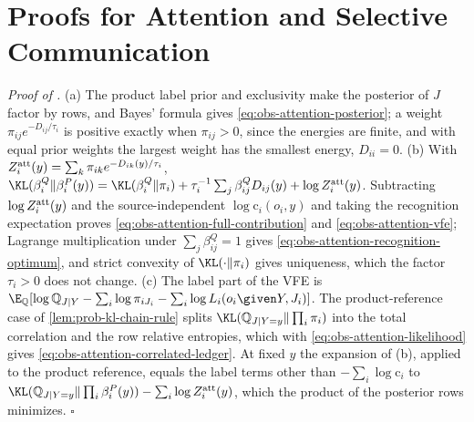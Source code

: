\section{Proofs for Attention and Selective Communication}
\label{sec:proofs-attention}

\noindent\emph{Proof of .}
(a) The product label prior and exclusivity make the posterior of \(J\) factor
by rows, and Bayes' formula gives \eqref{eq:obs-attention-posterior}; a weight
\(\pi_{ij}e^{-D_{ij}/\tau_i}\) is positive exactly when \(\pi_{ij}>0\), since
the energies are finite, and with equal prior weights the largest weight has
the smallest energy, \(D_{ii}=0\). (b) With
\(Z_i^{\rm att}(y)=\sum_k\pi_{ik}e^{-D_{ik}(y)/\tau_i}\),
\(\KL(\beta^Q_i\Vert\beta^P_i(y))=\KL(\beta^Q_i\Vert\pi_i)
+\tau_i^{-1}\sum_j\beta^Q_{ij}D_{ij}(y)+\log Z_i^{\rm att}(y)\). Subtracting
\(\log Z_i^{\rm att}(y)\) and the source-independent \(\log\mathrm c_i(o_i,y)\)
and taking the recognition expectation proves
\eqref{eq:obs-attention-full-contribution} and \eqref{eq:obs-attention-vfe};
Lagrange multiplication under \(\sum_j\beta^Q_{ij}=1\) gives
\eqref{eq:obs-attention-recognition-optimum}, and strict convexity of
\(\KL(\cdot\Vert\pi_i)\) gives uniqueness, which the factor \(\tau_i>0\) does
not change. (c) The label part of the VFE is
\(\E_{\mathbb Q}[\log\mathbb Q_{J\mid Y}-\sum_i\log\pi_{iJ_i}
-\sum_i\log L_i(o_i\given Y,J_i)]\). The product-reference case of
\cref{lem:prob-kl-chain-rule} splits
\(\KL(\mathbb Q_{J\mid Y=y}\Vert\prod_i\pi_i)\) into the total correlation and
the row relative entropies, which with \eqref{eq:obs-attention-likelihood}
gives \eqref{eq:obs-attention-correlated-ledger}. At fixed \(y\) the expansion
of (b), applied to the product reference, equals the label terms other than
\(-\sum_i\log\mathrm c_i\) to
\(\KL(\mathbb Q_{J\mid Y=y}\Vert\prod_i\beta^P_i(y))-\sum_i\log Z_i^{\rm att}(y)\),
which the product of the posterior rows minimizes. \(\square\)

